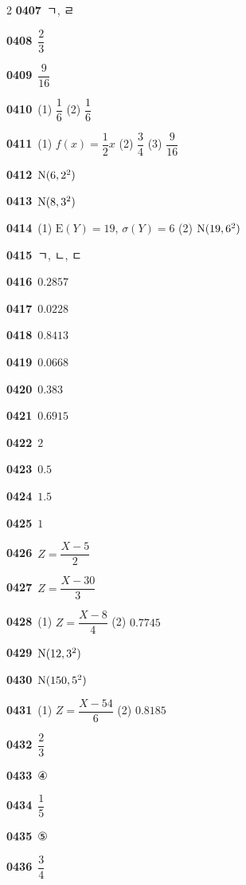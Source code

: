 \documentclass[10pt,a4paper]{article}
\begin{document}
\begin{multicols}{2}
\noindent\textbf{0407}\ ㄱ, ㄹ\par
\noindent\textbf{0408}\ $\dfrac{2}{3}$\par
\noindent\textbf{0409}\ $\dfrac{9}{16}$\par
\noindent\textbf{0410}\ (1) $\dfrac{1}{6}$ (2) $\dfrac{1}{6}$\par
\noindent\textbf{0411}\ (1) $f(x)=\dfrac{1}{2}x$ (2) $\dfrac{3}{4}$ (3) $\dfrac{9}{16}$\par
\noindent\textbf{0412}\ $\mathrm{N}(6{,}\mkern3mu\mathopen{}2^2)$\par
\noindent\textbf{0413}\ $\mathrm{N}(8{,}\mkern3mu\mathopen{}3^2)$\par
\noindent\textbf{0414}\ (1) $\mathrm{E}(Y)=19$, $\sigma(Y)=6$ (2) $\mathrm{N}(19{,}\mkern3mu\mathopen{}6^2)$\par
\noindent\textbf{0415}\ ㄱ, ㄴ, ㄷ\par
\noindent\textbf{0416}\ $0.2857$\par
\noindent\textbf{0417}\ $0.0228$\par
\noindent\textbf{0418}\ $0.8413$\par
\noindent\textbf{0419}\ $0.0668$\par
\noindent\textbf{0420}\ $0.383$\par
\noindent\textbf{0421}\ $0.6915$\par
\noindent\textbf{0422}\ $2$\par
\noindent\textbf{0423}\ $0.5$\par
\noindent\textbf{0424}\ $1.5$\par
\noindent\textbf{0425}\ $1$\par
\noindent\textbf{0426}\ $Z=\dfrac{X-5}{2}$\par
\noindent\textbf{0427}\ $Z=\dfrac{X-30}{3}$\par
\noindent\textbf{0428}\ (1) $Z=\dfrac{X-8}{4}$ (2) $0.7745$\par
\noindent\textbf{0429}\ $\mathrm{N}(12{,}\mkern3mu\mathopen{}3^2)$\par
\noindent\textbf{0430}\ $\mathrm{N}(150{,}\mkern3mu\mathopen{}5^2)$\par
\noindent\textbf{0431}\ (1) $Z=\dfrac{X-54}{6}$ (2) $0.8185$\par
\noindent\textbf{0432}\ $\dfrac{2}{3}$\par
\noindent\textbf{0433}\ ④\par
\noindent\textbf{0434}\ $\dfrac{1}{5}$\par
\noindent\textbf{0435}\ ⑤\par
\noindent\textbf{0436}\ $\dfrac{3}{4}$\par

\end{multicols}
\end{document}
